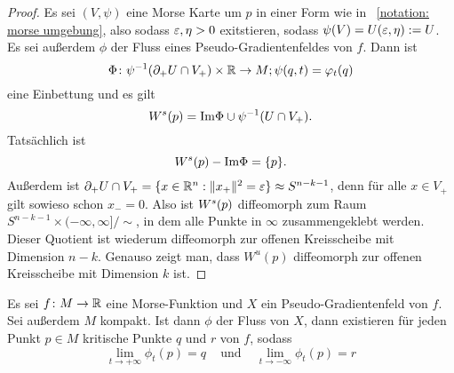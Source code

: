 \begin{proof}
    Es sei $(V, \psi)$ eine Morse Karte um $p$ in einer Form wie in ~\ref{notation: morse umgebung},
    also sodass $\varepsilon, \eta > 0$ exitstieren, sodass $\psi(V) = U(\varepsilon, \eta) := U$. Es sei außerdem
    $\phi$ der Fluss eines Pseudo-Gradientenfeldes von $f$. Dann ist 
    \[ \Phi \colon \psi^{-1}({ \partial }_+ U \cap V_+) \times { \mathbb R } \to M ; \psi(q, t) = \varphi_t(q) \]
    eine Einbettung und es gilt 
    \[ { W^s } (p) = { \operatorname{Im} } \Phi \cup \psi^{-1}(U \cap V_+) . \]
    Tatsächlich ist 
    \[ { W^s } (p) - { \operatorname{Im} } \Phi = \{ p \} . \]
    Außerdem ist ${ \partial }_+ U \cap V_+ = \{ x \in { \mathbb R }^n: \| x_+ \|^2 = \varepsilon \} \approx S^{n - k - 1}$, 
    denn für alle $x \in V_+$ gilt sowieso schon $x_- = 0$. Also ist $ { W^s }(p)$ diffeomorph zum Raum 
    $S^{n - k - 1} \times (-\infty, \infty]/\sim$, in dem alle Punkte in $\infty$ zusammengeklebt 
    werden. Dieser Quotient ist wiederum diffeomorph zur offenen Kreisscheibe mit Dimension $n - k$.
    Genauso zeigt man, dass $W^u (p)$ diffeomorph zur offenen Kreisscheibe mit Dimension $k$ ist.
\end{proof}

\begin{prop}
    Es sei $f \colon M \to { \mathbb R }$ eine Morse-Funktion und $X$ ein Pseudo-Gradientenfeld von $f$. 
    Sei außerdem $M$ kompakt. Ist dann $\phi$ der Fluss von $X$, dann existieren für jeden Punkt 
    $p \in M$ kritische Punkte $q$ und $r$ von $f$, sodass
    \[ \lim_{t \to + \infty} \phi_t(p) = q \;\;\; 
    \text{ und } \;\;\; \lim_{t \to -\infty} \phi_t(p) = r \]
\end{prop}

